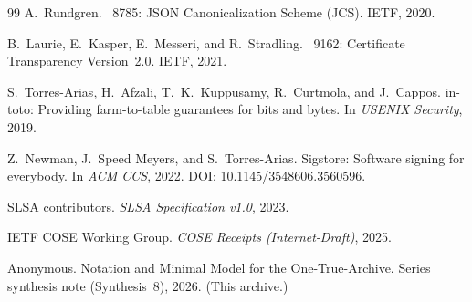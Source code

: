 \documentclass[11pt]{article}
\begin{document}
\begin{thebibliography}{99}
A.~Rundgren.
~8785: {JSON} Canonicalization Scheme ({JCS}).
\newblock IETF, 2020.

B.~Laurie, E.~Kasper, E.~Messeri, and R.~Stradling.
~9162: Certificate Transparency Version~2.0.
\newblock IETF, 2021.

S.~Torres-Arias, H.~Afzali, T.~K.~Kuppusamy, R.~Curtmola, and J.~Cappos.
\newblock in-toto: Providing farm-to-table guarantees for bits and bytes.
\newblock In \emph{USENIX Security}, 2019.

Z.~Newman, J.~Speed Meyers, and S.~Torres-Arias.
\newblock Sigstore: Software signing for everybody.
\newblock In \emph{ACM CCS}, 2022. DOI: 10.1145/3548606.3560596.

SLSA contributors.
\newblock \emph{SLSA Specification v1.0}, 2023.

IETF COSE Working Group.
\newblock \emph{COSE Receipts (Internet-Draft)}, 2025.

Anonymous.
\newblock Notation and Minimal Model for the One-True-Archive.
\newblock Series synthesis note (Synthesis~8), 2026. (This archive.)

\end{thebibliography}
\end{document}
